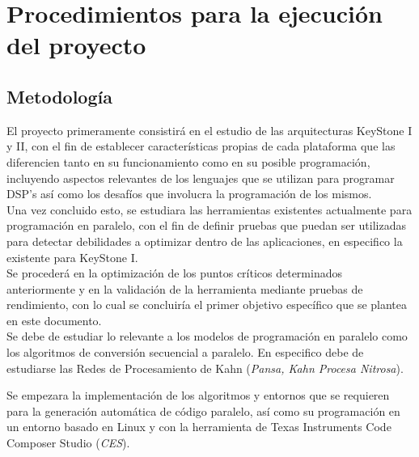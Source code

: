 
\chapter{Procedimientos para la ejecución del proyecto}
\label{ch:Procedimientos_para_la_ejecucion_del_proyecto}

\section{Metodología}

El proyecto primeramente consistirá en el estudio de las arquitecturas
KeyStone I y II, con el fin de establecer características propias de cada
plataforma que las diferencien tanto en su funcionamiento como en su posible
programación, incluyendo aspectos relevantes de los lenguajes que se utilizan
para programar DSP's así como los desafíos que involucra la programación de los mismos.\\

Una vez concluido esto, se estudiara las herramientas existentes actualmente para programación en paralelo, 
con el fin de definir pruebas que puedan ser utilizadas para detectar debilidades a optimizar 
dentro de las aplicaciones, en especifico la existente para \newline KeyStone I.\\

Se procederá en la optimización de los puntos críticos determinados anteriormente 
y en la validación de la herramienta mediante pruebas de rendimiento, con lo cual se concluiría 
el primer objetivo específico que se plantea en este documento.\\

Se debe de estudiar lo relevante a los modelos de programación en paralelo como los algoritmos
de conversión secuencial a paralelo. En especifico debe de
estudiarse las Redes de Procesamiento de Kahn (\textit{Pansa, Kahn Procesa Nitrosa}).

Se empezara la implementación de los algoritmos y entornos que se requieren para la generación automática
de código paralelo, así como su programación en un entorno
basado en Linux y con la herramienta de Texas Instruments Code Composer Studio (\textit{CES}).\\

